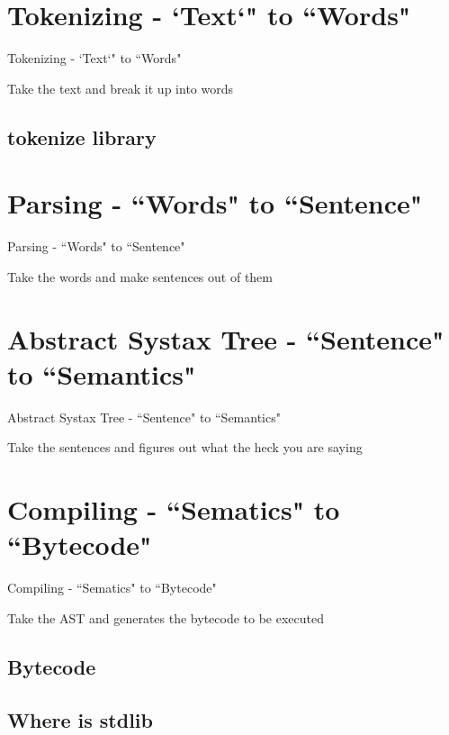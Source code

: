 \documentclass[aspectratio=169, dvipsnames, svgnames, x11names]{beamer}
\begin{document}
\section{Tokenizing - `Text`" to ``Words"}
\begin{frame}{Tokenizing - `Text`" to ``Words"}
\begin{itemize}
{\LARGE \item[-] Take the text and break it up into words}
\end{itemize}
\end{frame}

\subsection{{\ttfamily tokenize} library}

\section{Parsing - ``Words" to ``Sentence"}
\begin{frame}{Parsing - ``Words" to ``Sentence"}
\begin{itemize}
{\LARGE \item[-] Take the words and make sentences out of them}
\end{itemize}
\end{frame}

\section{Abstract Systax Tree - ``Sentence" to ``Semantics"}
\begin{frame}{Abstract Systax Tree - ``Sentence" to ``Semantics"}
\begin{itemize}
{\LARGE \item[-] Take the sentences and figures out what the heck you are saying}
\end{itemize}
\end{frame}

\section{Compiling - ``Sematics" to ``Bytecode"}
\begin{frame}{Compiling - ``Sematics" to ``Bytecode"}
\begin{itemize}
{\LARGE \item[-] Take the AST and generates the bytecode to be executed}
\end{itemize}
\end{frame}

\subsection{Bytecode}
\subsection{Where is {\ttfamily stdlib}}
\end{document}
